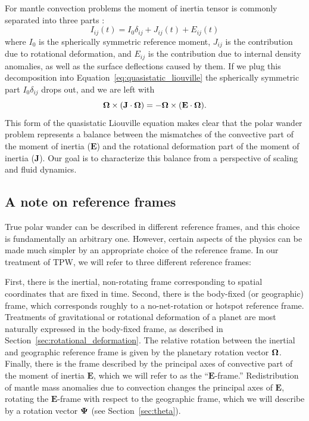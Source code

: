 \documentclass[extra,mreferee]{gji}
\begin{document}
For mantle convection problems the moment of inertia tensor is commonly separated into three parts \citep{sabadini1981pleistocene, spada1992excitation}:
\begin{equation}
I_{ij}(t) = I_0 \delta_{ij} + J_{ij}(t) + E_{ij}(t)
\label{eq:separation}
\end{equation}
where $I_0$ is the spherically symmetric reference moment, $J_{ij}$ is the contribution due to rotational deformation, and $E_{ij}$ is the contribution due to internal density anomalies, as well as the surface deflections caused by them.
If we plug this decomposition into Equation~\eqref{eq:quasistatic_liouville} the spherically symmetric part $I_0 \delta_{ij}$ drops out, and we are left with
\begin{equation}
\mathbf{\Omega} \times (\mathbf{J} \cdot \mitbf{\Omega}) = -\mitbf{\Omega} \times ( \mathbf{E} \cdot \mitbf{\Omega} ).
\label{eq:disequilibrium}
\end{equation}
This form of the quasistatic Liouville equation makes clear that the polar wander problem represents a balance between the mismatches
of the convective part of the moment of inertia ($\mathbf{E}$) and the rotational deformation part of the moment of inertia ($\mathbf{J}$).
Our goal is to characterize this balance from a perspective of scaling and fluid dynamics.

\subsection{A note on reference frames}
\label{sec:reference_frames}
True polar wander can be described in different reference frames, and this choice is fundamentally an arbitrary one.
However, certain aspects of the physics can be made much simpler by an appropriate choice of the reference frame.
In our treatment of TPW, we will refer to three different reference frames:

First, there is the inertial, non-rotating frame corresponding to spatial coordinates that are fixed in time.
Second, there is the body-fixed (or geographic) frame, which corresponds roughly to a no-net-rotation or hotspot reference frame. 
Treatments of gravitational or rotational deformation of a planet are most naturally expressed in the body-fixed frame,
as described in Section~\ref{sec:rotational_deformation}.
The relative rotation between the inertial and geographic reference frame is given by the planetary rotation vector $\mitbf{\Omega}$.
Finally, there is the frame described by the principal axes of convective part of the moment of inertia $\mathbf{E}$,
which we will refer to as the ``$\mathbf{E}$-frame.'' 
Redistribution of mantle mass anomalies due to convection changes the principal axes of $\mathbf{E}$, 
rotating the $\mathbf{E}$-frame with respect to the geographic frame, which we will describe
by a rotation vector $\mitbf{\Psi}$ (see Section~\ref{sec:theta}).
\end{document}

